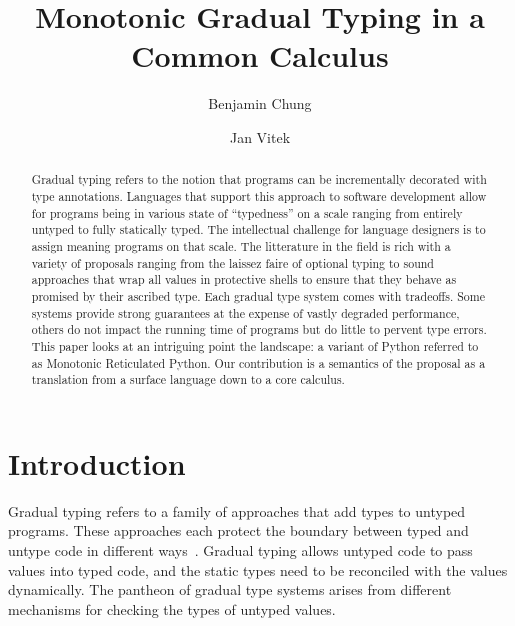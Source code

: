 \documentclass[sigconf]{acmart}
\begin{document}
\title{Monotonic Gradual Typing in a Common Calculus}
\subtitle{}

\author{Benjamin Chung}
\author{Jan Vitek}


\begin{abstract}
Gradual typing refers to the notion that programs can be incrementally
decorated with type annotations. Languages that
support this approach to software development allow for programs being in
various state of ``typedness'' on a scale ranging from entirely untyped
to fully statically typed. The intellectual challenge for language designers
is to assign meaning programs on that scale. The litterature in the field is
rich with a variety of proposals ranging from the laissez faire of optional
typing to sound approaches that wrap all values in protective shells to
ensure that they behave as promised by their ascribed type. Each gradual
type system comes with tradeoffs. Some systems provide strong guarantees at
the expense of vastly degraded performance, others do not impact the running
time of programs but do little to pervent type errors. This paper looks at
an intriguing point the landscape: a variant of Python referred to as
Monotonic Reticulated Python. Our contribution is a semantics of the
proposal as a translation from a surface language down to a core calculus.
\end{abstract}



\maketitle

\section{Introduction}

Gradual typing refers to a family of approaches that add types to untyped
programs. These approaches each protect the boundary between typed and untype
code in different ways~\cite{SiekTaha06,tf-dls06}. Gradual typing allows
untyped code to pass values into typed code, and the static types need to be
reconciled with the values dynamically. The pantheon of gradual type systems
arises from different mechanisms for checking the types of untyped values.
\end{document}
